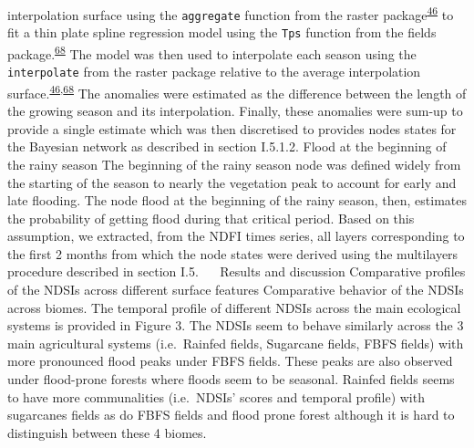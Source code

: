\documentclass[12pt,oneside]{article}
\begin{document}
interpolation surface using the \texttt{aggregate} function from the
raster package\textsuperscript{\protect\hyperlink{ref-Hijmans_2019}{46}}
to fit a thin plate spline regression model using the \texttt{Tps}
function from the fields
package.\textsuperscript{\protect\hyperlink{ref-Nychka_et_al_2018}{68}}
The model was then used to interpolate each season using the
\texttt{interpolate} from the raster package relative to the average
interpolation
surface.\textsuperscript{\protect\hyperlink{ref-Hijmans_2019}{46},\protect\hyperlink{ref-Nychka_et_al_2018}{68}}
The anomalies were estimated as the difference between the length of the
growing season and its interpolation. Finally, these anomalies were
sum-up to provide a single estimate which was then discretised to
provides nodes states for the Bayesian network as described in section
I.5.1.2. Flood at the beginning of the rainy season The beginning of the
rainy season node was defined widely from the starting of the season to
nearly the vegetation peak to account for early and late flooding. The
node flood at the beginning of the rainy season, then, estimates the
probability of getting flood during that critical period. Based on this
assumption, we extracted, from the NDFI times series, all layers
corresponding to the first 2 months from which the node states were
derived using the multilayers procedure described in section I.5.  
Results and discussion Comparative profiles of the NDSIs across
different surface features Comparative behavior of the NDSIs across
biomes. The temporal profile of different NDSIs across the main
ecological systems is provided in Figure 3. The NDSIs seem to behave
similarly across the 3 main agricultural systems (i.e.~Rainfed fields,
Sugarcane fields, FBFS fields) with more pronounced flood peaks under
FBFS fields. These peaks are also observed under flood-prone forests
where floods seem to be seasonal. Rainfed fields seems to have more
communalities (i.e.~NDSIs' scores and temporal profile) with sugarcanes
fields as do FBFS fields and flood prone forest although it is hard to
distinguish between these 4 biomes.
\end{document}

